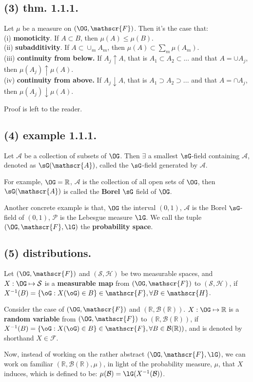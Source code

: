 \documentclass[12pt]{article}
\newcommand\Ev\forall%
\newcommand\Ex\exists%
\newcommand{\BF}[1]{ \mathbb{#1} }%
\newcommand{\CF}[1]{ \mathcal{#1} }%
\newcommand{\SF}[1]{ \mathscr{#1} }%
\newcommand{\Ss}[1]{\textsf{\textbf{#1}}}%
\begin{document}
\subsection*{(3) thm. 1.1.1.} Let \(\mu\) be a measure on \((\OG, \SF{F})\). Then it's the case that: \\
\indent (i) \Ss{monoticity}. If \(A \subset B\), then \(\mu(A) \leq \mu(B)\). \\
\indent (ii) \Ss{subadditivity}. If \(A \subset \cup_m A_m\), then \(\mu(A) \subset \sum_m \mu(A_m)\). \\
\indent (iii) \Ss{continuity from below.} If \(A_j \uparrow A\), that is \(A_1 \subset A_2 \subset...\) and that \(A= \cup A_j\), then \(\mu(A_j) \uparrow \mu(A)\). \\
\indent (iv) \Ss{continuity from above.} If \(A_j \downarrow A\), that is \(A_1 \supset A_2 \supset...\) and that \(A= \cap A_j\), then \(\mu(A_j) \downarrow \mu(A)\). \par
Proof is left to the reader.

\subsection*{(4) example 1.1.1.} Let \(\SF A\) be a collection of subsets of \(\OG\). 
Then \(\Ex\) a smallest \(\sG\)-field containing \(\SF A\), denoted as \(\sG(\SF A)\), called the \(\sG\)-field generated by \(\SF A\). \par
For example, \(\OG =\BF R\), \(\SF A\) is the collection of all open sets of \(\OG\), then \(\sG(\SF A)\) is called the \Ss{Borel} \(\sG\) field of \(\OG\). \par
Another concrete example is that, \(\OG\) the interval \((0,1)\), \(\SF A\) is the Borel \(\sG\)-field of \((0,1)\), \(\CF{P}\) is the Lebesgue measure \(\lG\). We call the tuple \((\OG, \SF{F}, \lG)\) the \Ss{probability space}. 

\subsection*{(5) distributions.} Let \((\OG, \SF{F})\) and \((\CF S, \SF H)\) be two measurable spaces, 
and \(X: \OG \mapsto \CF S\) is a \Ss{measurable map} from \((\OG, \SF{F})\) to \((\CF S, \SF H)\), 
if \(X^{-1}(B) = \{\oG: X(\oG) \in B\} \in \SF{F}, \Ev B \in \SF H\). \par
Consider the case of \((\OG, \SF{F})\) and \((\BF R, \CF B(\BF R))\). 
\(X: \OG \mapsto \BF R\) is a \Ss{random variable} from \((\OG, \SF{F})\) to \((\BF R, \CF B(\BF R))\), 
if \(X^{-1}(B) = \{\oG: X(\oG) \in B\} \in \SF{F}, \Ev B \in \CF B(\BF R))\), 
and is denoted by shorthand \(X \in \SF{F}\). \par
Now, instead of working on the rather abstract \((\OG, \SF{F}, \lG)\), 
we can work on familiar \((\BF R, \CF B(\BF R), \mu)\), 
in light of the probability measure, \(\mu\), that \(X\) induces, which is defined to be: \(\mu(\CF B) = \lG( X^{-1}(\CF B) )\). 
\end{document}

